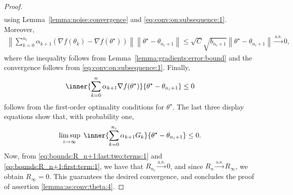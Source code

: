 \documentclass[11pt,a4paper]{article}
\theoremstyle{definition}
\begin{document}
\begin{proof}
\begin{align*}
\end{align*}
using Lemma~\ref{lemma:noise:convergence} and \eqref{eq:conv:on:subsequence:1}. Moreover, 
\begin{align*}
    \left\| \sum_{k=0}^{n_i} \alpha_{k+1}(\nabla {f}(\theta_k) - \nabla{f}(\theta^\star)) \right\| \left\| \theta^\star-\theta_{n_i+1} \right\| \leq \sqrt{C} \sqrt{b_{n_i+1}} \left\| \theta^\star-\theta_{n_i+1}  \right\|\overset{\text{a.s.}}{\to} 0,
\end{align*}
where the inequality follows from Lemma~\ref{lemma:gradients:error:bound} and the convergence follows from \eqref{eq:conv:on:subsequence:1}. Finally, 
\begin{align*}
    \inner{\sum_{k=0}^n \alpha_{k+1} \nabla{f}(\theta^\star)}{\theta^\star-\theta_{n_i+1} } \leq 0
\end{align*}
follows from the first-order optimality conditions for $\theta^\star$. The last three display equations show that, with probability one,
\begin{align}
\label{eq:bounds:R_n+1:first:term:1}
    \limsup_{i \to \infty}\; \inner{\sum_{k=0}^{n_i} \alpha_{k+1} G_k}{\theta^\star-\theta_{n_i+1}} \leq 0.
\end{align}
Now, from \eqref{eq:bounds:R_n+1:last:two:terms:1} and \eqref{eq:bounds:R_n+1:first:term:1}, we have that $R_{n_i} \overset{\text{a.s.}}{\to} 0$, and since $R_n \overset{\text{a.s.}}{\to} R_\infty$, we obtain $R_\infty = 0$. This guarantees the desired convergence, and concludes the proof of assertion \ref{lemma:as:conv:theta:4}.

\medskip


\end{proof}
\end{document}
